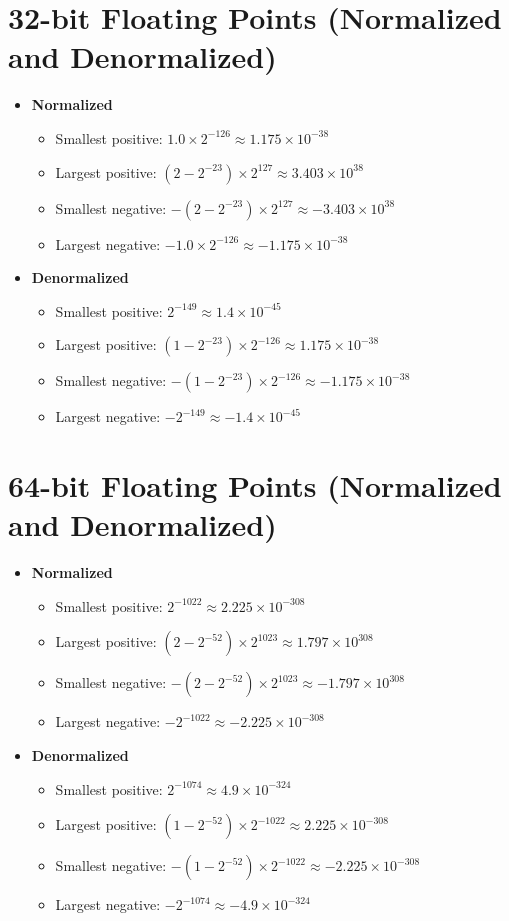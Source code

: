 \documentclass{article}
\begin{document}
\section{32-bit Floating Points (Normalized and Denormalized)}
\begin{itemize}
\item \textbf{Normalized}
  \begin{itemize}
    \item Smallest positive: $1.0 \times 2^{-126} \approx 1.175 \times 10^{-38}$
    \item Largest positive: $(2 - 2^{-23}) \times 2^{127} \approx 3.403 \times 10^{38}$
    \item Smallest negative: $- (2 - 2^{-23}) \times 2^{127} \approx -3.403 \times 10^{38}$
    \item Largest negative: $-1.0 \times 2^{-126} \approx -1.175 \times 10^{-38}$
  \end{itemize}
\item \textbf{Denormalized}
  \begin{itemize}
    \item Smallest positive: $2^{-149} \approx 1.4 \times 10^{-45}$
    \item Largest positive: $(1 - 2^{-23}) \times 2^{-126} \approx 1.175 \times 10^{-38}$
    \item Smallest negative: $- (1 - 2^{-23}) \times 2^{-126} \approx -1.175 \times 10^{-38}$
    \item Largest negative: $-2^{-149} \approx -1.4 \times 10^{-45}$
  \end{itemize}
\end{itemize}

\section{64-bit Floating Points (Normalized and Denormalized)}
\begin{itemize}
\item \textbf{Normalized}
  \begin{itemize}
    \item Smallest positive: $2^{-1022} \approx 2.225 \times 10^{-308}$
    \item Largest positive: $(2 - 2^{-52}) \times 2^{1023} \approx 1.797 \times 10^{308}$
    \item Smallest negative: $- (2 - 2^{-52}) \times 2^{1023} \approx -1.797 \times 10^{308}$
    \item Largest negative: $-2^{-1022} \approx -2.225 \times 10^{-308}$
  \end{itemize}
\item \textbf{Denormalized}
  \begin{itemize}
    \item Smallest positive: $2^{-1074} \approx 4.9 \times 10^{-324}$
    \item Largest positive: $(1 - 2^{-52}) \times 2^{-1022} \approx 2.225 \times 10^{-308}$
    \item Smallest negative: $- (1 - 2^{-52}) \times 2^{-1022} \approx -2.225 \times 10^{-308}$
    \item Largest negative: $-2^{-1074} \approx -4.9 \times 10^{-324}$
  \end{itemize}
\end{itemize}
\end{document}
